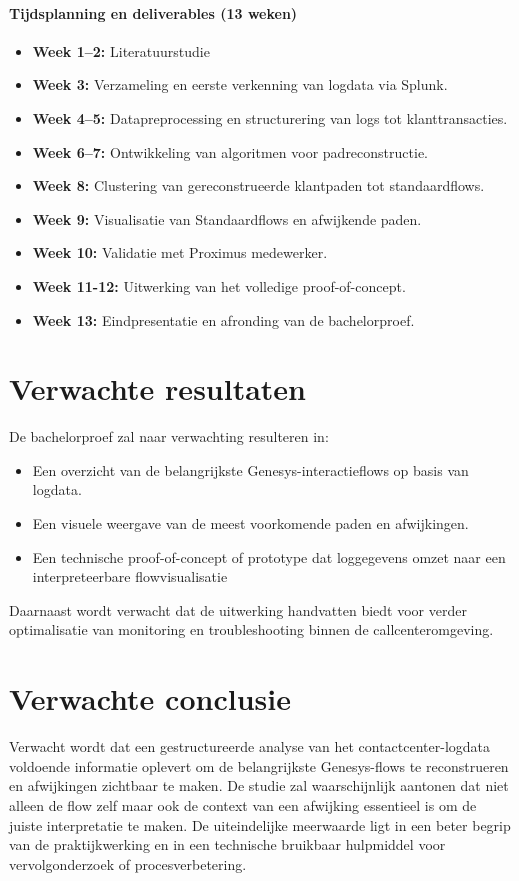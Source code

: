 \paragraph{Tijdsplanning en deliverables (13 weken)}
\begin{itemize}
  \item \textbf{Week 1--2:} Literatuurstudie
  \item \textbf{Week 3:} Verzameling en eerste verkenning van logdata via Splunk.
  \item \textbf{Week 4--5:} Datapreprocessing en structurering van logs tot klanttransacties.
  \item \textbf{Week 6--7:} Ontwikkeling van algoritmen voor padreconstructie.
  \item \textbf{Week 8:} Clustering van gereconstrueerde klantpaden tot standaardflows.
  \item \textbf{Week 9:} Visualisatie van Standaardflows en afwijkende paden.
  \item \textbf{Week 10:} Validatie met Proximus medewerker.
  \item \textbf{Week 11-12:} Uitwerking van het volledige proof-of-concept.
  \item \textbf{Week 13:} Eindpresentatie en afronding van de bachelorproef.
\end{itemize}
\section{Verwachte resultaten}%
\label{sec:verwachte_resultaten}

De bachelorproef zal naar verwachting resulteren in:
\begin{itemize}
  \item Een overzicht van de belangrijkste Genesys-interactieflows op basis van logdata.
  \item Een visuele weergave van de meest voorkomende paden en afwijkingen.
  \item Een technische proof-of-concept of prototype dat loggegevens omzet naar een interpreteerbare flowvisualisatie
\end{itemize}
Daarnaast wordt verwacht dat de uitwerking handvatten biedt voor verder optimalisatie van monitoring en troubleshooting binnen de callcenteromgeving.
\section{Verwachte conclusie}
\label{sec:verwachte_conclusie}
Verwacht wordt dat een gestructureerde analyse van het contactcenter-logdata voldoende informatie oplevert om de belangrijkste Genesys-flows te reconstrueren en afwijkingen zichtbaar te maken. De studie zal waarschijnlijk aantonen dat niet alleen de flow zelf maar ook de context van een afwijking essentieel is om de juiste interpretatie te maken. De uiteindelijke meerwaarde ligt in een beter begrip van de praktijkwerking en in een technische bruikbaar hulpmiddel voor vervolgonderzoek of procesverbetering.


